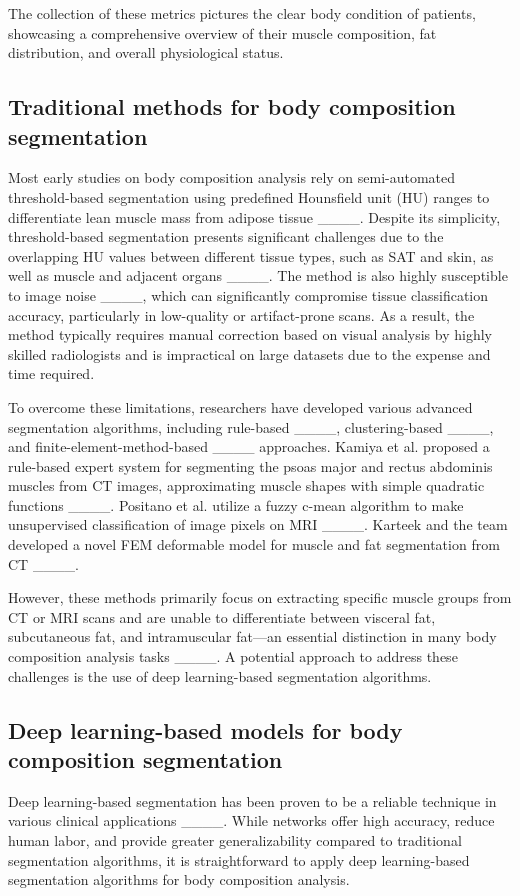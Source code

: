The collection of these metrics pictures the clear body condition of patients, showcasing a comprehensive overview of their muscle composition, fat distribution, and overall physiological status.

\subsection{Traditional methods for body composition segmentation}
Most early studies on body composition analysis rely on semi-automated threshold-based segmentation using predefined Hounsfield unit (HU) ranges to differentiate lean muscle mass from adipose tissue ____. Despite its simplicity, threshold-based segmentation presents significant challenges due to the overlapping HU values between different tissue types, such as SAT and skin, as well as muscle and adjacent organs ____. The method is also highly susceptible to image noise ____, which can significantly compromise tissue classification accuracy, particularly in low-quality or artifact-prone scans. As a result, the method typically requires manual correction based on visual analysis by highly skilled radiologists and is impractical on large datasets due to the expense and time required.

To overcome these limitations, researchers have developed various advanced segmentation algorithms, including rule-based ____, clustering-based ____, and finite-element-method-based ____ approaches. Kamiya et al. proposed a rule-based expert system for segmenting the psoas major and rectus abdominis muscles from CT images, approximating muscle shapes with simple quadratic functions ____. Positano et al. utilize a fuzzy c-mean algorithm to make unsupervised classification of image pixels on MRI ____. Karteek and the team developed a novel FEM deformable model for muscle and fat segmentation from CT ____.

However, these methods primarily focus on extracting specific muscle groups from CT or MRI scans and are unable to differentiate between visceral fat, subcutaneous fat, and intramuscular fat—an essential distinction in many body composition analysis tasks ____. A potential approach to address these challenges is the use of deep learning-based segmentation algorithms.

\subsection{Deep learning-based models for body composition segmentation}
Deep learning-based segmentation has been proven to be a reliable technique in various clinical applications ____. While networks offer high accuracy, reduce human labor, and provide greater generalizability compared to traditional segmentation algorithms, it is straightforward to apply deep learning-based segmentation algorithms for body composition analysis.

